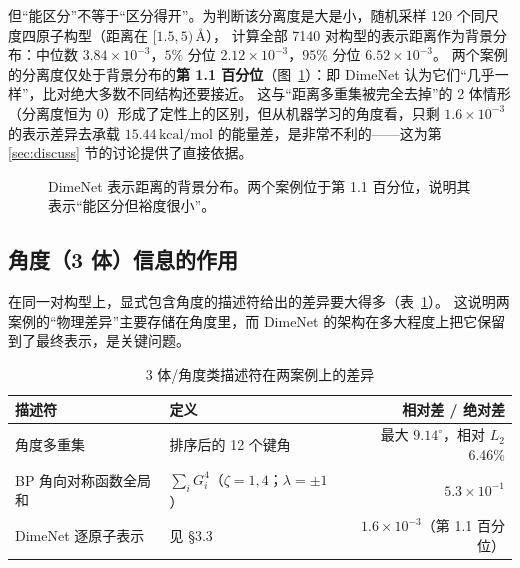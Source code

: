 \documentclass[UTF8,a4paper,11pt]{ctexart}
\newcommand{\kcal}{\,\mathrm{kcal/mol}}
\newcommand{\ang}{\,\text{\AA}}
\begin{document}
但“能区分”不等于“区分得开”。为判断该分离度是大是小，随机采样 120 个同尺度四原子构型（距离在 $[1.5,5)\ang$），
计算全部 7140 对构型的表示距离作为背景分布：中位数 $3.84\times10^{-3}$，$5\%$ 分位 $2.12\times10^{-3}$，$95\%$ 分位 $6.52\times10^{-3}$。
两个案例的分离度仅处于背景分布的\textbf{第 1.1 百分位}（图~\ref{fig:bgsep}）：即 DimeNet 认为它们“几乎一样”，比对绝大多数不同结构还要接近。
这与“距离多重集被完全去掉”的 2 体情形（分离度恒为 0）形成了定性上的区别，但从机器学习的角度看，只剩 $1.6\times10^{-3}$ 的表示差异去承载 $15.44\kcal$
的能量差，是非常不利的——这为第 \ref{sec:discuss} 节的讨论提供了直接依据。

\begin{figure}[H]
\centering
{}
\caption{DimeNet 表示距离的背景分布。两个案例位于第 1.1 百分位，说明其表示“能区分但裕度很小”。}
\label{fig:bgsep}
\end{figure}

\subsection{角度（3 体）信息的作用}
在同一对构型上，显式包含角度的描述符给出的差异要大得多（表~\ref{tab:3body}）。
这说明两案例的“物理差异”主要存储在角度里，而 DimeNet 的架构在多大程度上把它保留到了最终表示，是关键问题。

\begin{table}[H]
\centering\small
\caption{3 体/角度类描述符在两案例上的差异}
\label{tab:3body}
\begin{tabular}{@{}llr@{}}
\toprule
描述符 & 定义 & 相对差 / 绝对差\\
\midrule
角度多重集 & 排序后的 12 个键角 & 最大 $9.14^\circ$，相对 $L_2$ $6.46\%$\\
BP 角向对称函数\cite{bp}全局和 & $\sum_i G^4_i$（$\zeta=1,4$；$\lambda=\pm1$） & $5.3\times10^{-1}$\\
DimeNet 逐原子表示 & 见 \S 3.3 & $1.6\times10^{-3}$（第 1.1 百分位）\\
\bottomrule
\end{tabular}
\end{table}
\end{document}
